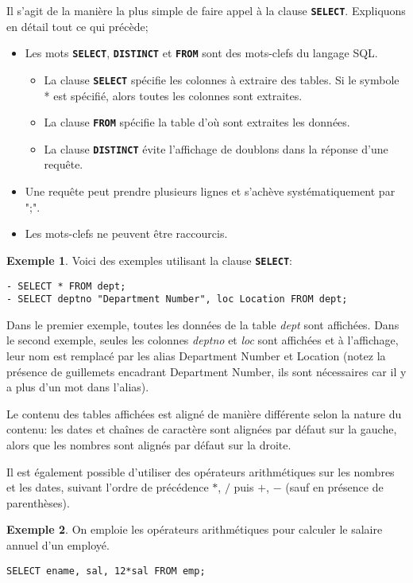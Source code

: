 \documentclass[a4paper, 12pt]{report}
\newcommand{\textSQL}[1]{\texttt{\textbf{#1}}}
\theoremstyle{definition} \newtheorem{ex}{Exemple}
\begin{document}
Il s'agit de la manière la plus simple de faire appel à la clause \textSQL{SELECT}. Expliquons en détail tout ce qui précède;
\begin{itemize}
\item Les mots \textSQL{SELECT}, \textSQL{DISTINCT} et \textSQL{FROM} sont des mots-clefs du langage SQL. 
	\begin{itemize}
		\item La clause \textSQL{SELECT} spécifie les colonnes à extraire des tables. Si le symbole * est spécifié, alors toutes les colonnes sont extraites.
		\item La clause \textSQL{FROM} spécifie la table d'où sont extraites les données.
		\item La clause \textSQL{DISTINCT} évite l'affichage de doublons dans la réponse d'une requête.
	\end{itemize}
\item Une requête peut prendre plusieurs lignes et s'achève systématiquement par ";".
\item Les mots-clefs ne peuvent être raccourcis.
\end{itemize}
\begin{ex}
Voici des exemples utilisant la clause \textSQL{SELECT}:

\begin{lstlisting}[frame=single]
- SELECT * FROM dept;
- SELECT deptno "Department Number", loc Location FROM dept; 
\end{lstlisting}
Dans le premier exemple, toutes les données de la table \emph{dept} sont affichées. Dans le second exemple, seules les colonnes \emph{deptno} et \emph{loc} sont affichées et  à l'affichage, leur nom est remplacé par les alias Department Number et Location (notez la présence de guillemets encadrant Department Number, ils sont nécessaires car il y a plus d'un mot dans l'alias).
\end{ex}

 Le contenu des tables affichées est aligné de manière différente selon la nature du contenu: les dates et chaînes de caractère sont alignées par défaut sur la gauche, alors que les nombres sont alignés par défaut sur la droite.

Il est également possible d'utiliser des opérateurs arithmétiques sur les nombres et les dates, suivant l'ordre de précédence $*$, $/$ puis $+$, $-$ (sauf en présence de parenthèses).
\begin{ex}
On emploie les opérateurs arithmétiques pour calculer le salaire annuel d'un employé.
\begin{lstlisting}[frame=single]
SELECT ename, sal, 12*sal FROM emp;
\end{lstlisting}
\end{ex}
\end{document}
